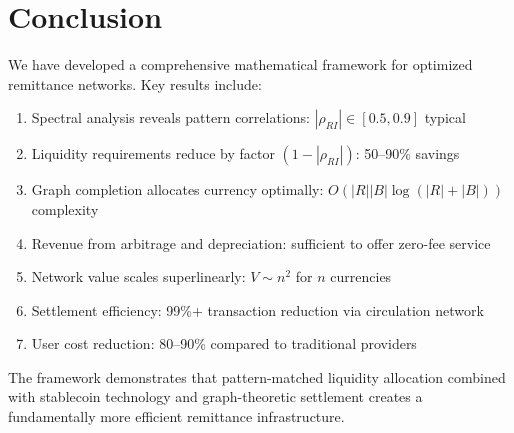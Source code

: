 \documentclass[12pt]{article}
\begin{document}
\section{Conclusion}

We have developed a comprehensive mathematical framework for optimized remittance networks. Key results include:

\begin{enumerate}
    \item Spectral analysis reveals pattern correlations: $|\rho_{RI}| \in [0.5, 0.9]$ typical
    \item Liquidity requirements reduce by factor $(1-|\rho_{RI}|)$: 50--90\% savings
    \item Graph completion allocates currency optimally: $O(|R||B|\log(|R|+|B|))$ complexity
    \item Revenue from arbitrage and depreciation: sufficient to offer zero-fee service
    \item Network value scales superlinearly: $V \sim n^2$ for $n$ currencies
    \item Settlement efficiency: 99\%+ transaction reduction via circulation network
    \item User cost reduction: 80--90\% compared to traditional providers
\end{enumerate}

The framework demonstrates that pattern-matched liquidity allocation combined with stablecoin technology and graph-theoretic settlement creates a fundamentally more efficient remittance infrastructure.
\end{document}
